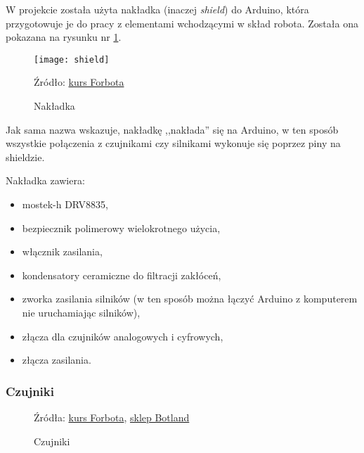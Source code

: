 \documentclass[11pt]{article}
\begin{document}
W projekcie została użyta nakładka (inaczej \emph{shield}) do Arduino, która przygotowuje je do pracy z elementami wchodzącymi w skład robota. Została ona pokazana na rysunku nr \ref{fig:shield}.

\begin{figure}[htbp!]
	\centering
	\texttt{[image: shield]}
	\caption{Nakładka \label{fig:shield}}
	Źródło: \href{https://forbot.pl/blog/kurs-budowy-robotow-sterownik-robota-arduino-czujniki-id19006#gallery-2}{kurs Forbota}
\end{figure}

Jak sama nazwa wskazuje, nakładkę ,,nakłada'' się na Arduino, w ten sposób wszystkie połączenia z czujnikami czy silnikami wykonuje się poprzez piny na shieldzie.

Nakładka zawiera:
\begin{itemize}
\item mostek-h DRV8835,
\item bezpiecznik polimerowy wielokrotnego użycia,
\item włącznik zasilania,
\item kondensatory ceramiczne do filtracji zakłóceń,
\item zworka zasilania silników (w ten sposób można łączyć Arduino z komputerem nie uruchamiając silników),
\item złącza dla czujników analogowych i cyfrowych,
\item złącza zasilania.
\end{itemize}

\subsubsection*{Czujniki}

\newcommand{\figTwo}{0.24}


\begin{figure}[htbp!]
	\centering

	\hfill%
	
	\caption{Czujniki \label{fig:sensors}}
	Źródła: \href{https://forbot.pl/blog/kurs-budowy-robotow-swiatlolub-sterowanie-latarka-id19362#gallery-3}{kurs Forbota}, \href{https://botland.com.pl/czujniki-odbiciowe/14274-czujnik-odleglosci-odbiciowy-33v5v-iduino-st1140-5903351242400.html}{sklep Botland}
\end{figure}
\end{document}
